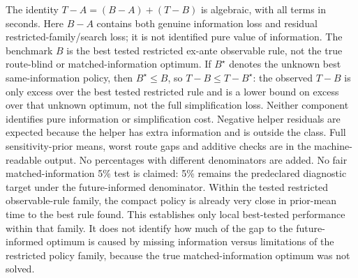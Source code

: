 \documentclass[11pt]{article}
\theoremstyle{definition}\newtheorem{definition}[theorem]{Definition}
\begin{document}
The identity $T-A=(B-A)+(T-B)$ is algebraic, with all terms in seconds. Here $B-A$ contains both genuine information loss and residual restricted-family/search loss; it is not identified pure value of information. The benchmark $B$ is the best tested restricted ex-ante observable rule, not the true route-blind or matched-information optimum. If $B^\star$ denotes the unknown best same-information policy, then $B^\star\le B$, so $T-B\le T-B^\star$: the observed $T-B$ is only excess over the best tested restricted rule and is a lower bound on excess over that unknown optimum, not the full simplification loss. Neither component identifies pure information or simplification cost. Negative helper residuals are expected because the helper has extra information and is outside the class. Full sensitivity-prior means, worst route gaps and additive checks are in the machine-readable output. No percentages with different denominators are added. No fair matched-information 5\% test is claimed: 5\% remains the predeclared diagnostic target under the future-informed denominator.
Within the tested restricted observable-rule family, the compact policy is already very close in prior-mean time to the best rule found. This establishes only local best-tested performance within that family. It does not identify how much of the gap to the future-informed optimum is caused by missing information versus limitations of the restricted policy family, because the true matched-information optimum was not solved.
\end{document}
